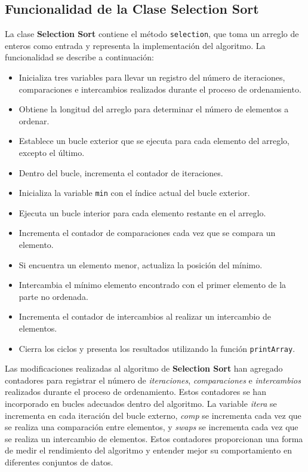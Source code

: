\documentclass[12pt]{article}
\begin{document}
\subsection*{Funcionalidad de la Clase Selection Sort}
\par\vspace{0.4cm}
La clase \textbf{Selection Sort} contiene el método \texttt{selection}, que toma un arreglo de enteros como entrada y representa la implementación del algoritmo. La funcionalidad se describe a continuación:
\begin{itemize}
    \item Inicializa tres variables para llevar un registro del número de iteraciones, comparaciones e intercambios realizados durante el proceso de ordenamiento.
    \item Obtiene la longitud del arreglo para determinar el número de elementos a ordenar.
    \item Establece un bucle exterior que se ejecuta para cada elemento del arreglo, excepto el último.
    \item Dentro del bucle, incrementa el contador de iteraciones.
    \item Inicializa la variable \texttt{min} con el índice actual del bucle exterior.
    \item Ejecuta un bucle interior para cada elemento restante en el arreglo.
    \item Incrementa el contador de comparaciones cada vez que se compara un elemento.
    \item Si encuentra un elemento menor, actualiza la posición del mínimo.
    \item Intercambia el mínimo elemento encontrado con el primer elemento de la parte no ordenada.
    \item Incrementa el contador de intercambios al realizar un intercambio de elementos.
    \item Cierra los ciclos y presenta los resultados utilizando la función \texttt{printArray}.
\end{itemize}
\par\vspace{0.4cm}
Las modificaciones realizadas al algoritmo de \textbf{Selection Sort} han agregado contadores para registrar el número de \textit{iteraciones}, \textit{comparaciones} e \textit{intercambios} realizados durante el proceso de ordenamiento. Estos contadores se han incorporado en bucles adecuados dentro del algoritmo. La variable \textit{itera} se incrementa en cada iteración del bucle externo, \textit{comp} se incrementa cada vez que se realiza una comparación entre elementos, y \textit{swaps} se incrementa cada vez que se realiza un intercambio de elementos. Estos contadores proporcionan una forma de medir el rendimiento del algoritmo y entender mejor su comportamiento en diferentes conjuntos de datos.
\end{document}
